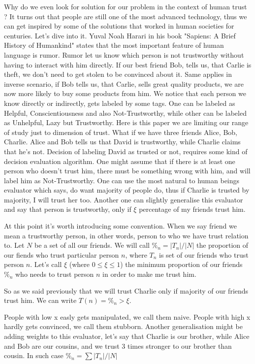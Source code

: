 \documentclass[runningheads]{llncs}
\begin{document}
Why do we even look for solution for our problem in the context of human trust ? It turns out that people are still one of the most advanced technology, thus we can get inspired by some of the solutions that worked in human societies for centuries. Let's dive into it.
Yuval Noah Harari in his book "Sapiens: A Brief History of Humankind" states that the most important feature of human language is rumor. Rumor let us know which person is not trustworthy without having to interact with him directly. If our best friend Bob, tells us, that Carlie is theft, we don't need to get stolen to be convinced about it. Same applies in inverse scenario, if Bob tells us, that Carlie, sells great quality products, we are now more likely to buy some products from him. We notice that each person we know directly or indirectly, gets labeled by some tags. One can be labeled as Helpful, Conscientiousness and also Not-Trustworthy, while other can be labeled as Unhelpful, Lazy but Trustworthy. Here is this paper we are limiting our range of study just to dimension of trust.
What if we have three friends Alice, Bob, Charlie. Alice and  Bob tells us that David is trustworthy, while Charlie claims that he's not. Decision of labeling David as trusted or not, requires some kind of decision evaluation algorithm.
One might assume that if there is at least one person who doesn't trust him, there must be something wrong with him, and will label him as Not-Trustworthy. One can use the most natural to human beings evaluator which says, do want majority of people do, thus if Charlie is trusted by majority, I will trust her too. Another one can slightly generalise this evaluator and say that person is trustworthy, only if $\xi$ percentage of my friends trust him. 

At this point it's worth introducing some convention. When we say friend we mean a trustworthy person, in other words, person to who we have trust relation to. Let $N$ be a set of all our friends. We will call $\%_n = |T_n|/|N|$ the proportion of our fiends who trust particular person $n$, where $T_n$ is set of our friends who trust person $n$. Let's call $\xi$ (where $0 \le \xi \leq 1$) the minimum proportion of our friends $\%_n$ who needs to trust person $n$ in order to make me trust him. 

So as we said previously that we will trust Charlie only if majority of our friends trust him. We can write $T(n) = \%_n > \xi$.

People with low x easly gets manipulated, we call them naive.
People with high x hardly gets convinced, we call them stubborn.
Another generalisation might be adding weights to this evaluator, let's say that Charlie is our brother, while Alice and Bob are our cousins, and we trust 3 times stronger to our brother than cousin. In such case $\%_n = \sum{}|T_n|/|N|$
\end{document}
